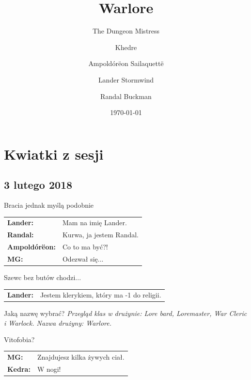 \documentclass[10pt,twoside,twocolumn]{book}
\title{Warlore}
\date{\today}
\author{The Dungeon Mistress}
\author{Khedre}
\author{Ampoldórëon Sailaquettë}
\author{Lander Stormwind}
\author{Randal Buckman}
\begin{document}
\selectfont %
\frontmatter

\maketitle
\begin{multicols}{2}
\tableofcontents
\end{multicols}

\mainmatter



\twocolumn
\normalsize
\chapter{Kwiatki z sesji}

\section*{3 lutego 2018}

\begin{rpg-quotebox}{Bracia jednak myślą podobnie}
   \begin{tabularx}{\columnwidth}{lX}
      \textbf{Lander:} & Mam na imię Lander.\\
      \textbf{Randal:} & Kurwa, ja jestem Randal.\\
      \textbf{Ampoldórëon:} &  Co to ma być?!\\
      \textbf{MG:} & Odezwał się...\\
   \end{tabularx}
\end{rpg-quotebox}

\begin{rpg-quotebox}{Szewc bez butów chodzi...}
   \begin{tabularx}{\columnwidth}{lX}
      \textbf{Lander:} & Jestem klerykiem, który ma -1 do religii.\\
   \end{tabularx}
\end{rpg-quotebox}

\begin{rpg-quotebox}{Jaką nazwę wybrać?}
   \textit{Przegląd klas w drużynie: Lore bard, Loremaster, War Cleric i Warlock. Nazwa drużyny: Warlore.}
\end{rpg-quotebox}

\begin{rpg-quotebox}{Vitofobia?}
   \begin{tabularx}{\columnwidth}{lX}
      \textbf{MG:} & Znajdujesz kilka żywych ciał.\\
      \textbf{Kedra:} & W nogi!\\
   \end{tabularx}
\end{rpg-quotebox}
\end{document}
